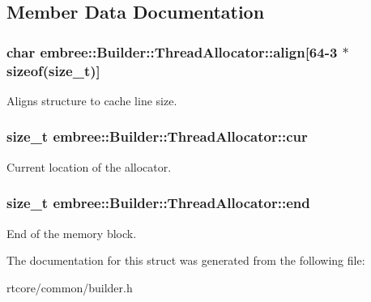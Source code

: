 \subsection{Member Data Documentation}
\hypertarget{structembree_1_1_builder_1_1_thread_allocator_aac64ccddbecccfb0a5d20421b9974179}{
\subsubsection[{align}]{\setlength{\rightskip}{0pt plus 5cm}char {\bf embree::Builder::ThreadAllocator::align}\mbox{[}64-\/3 $\ast$sizeof(size\_\-t)\mbox{]}}}
\label{structembree_1_1_builder_1_1_thread_allocator_aac64ccddbecccfb0a5d20421b9974179}


Aligns structure to cache line size. 

\hypertarget{structembree_1_1_builder_1_1_thread_allocator_abb22b1418877f34397ba8dedd4c3ce70}{
\subsubsection[{cur}]{\setlength{\rightskip}{0pt plus 5cm}size\_\-t {\bf embree::Builder::ThreadAllocator::cur}}}
\label{structembree_1_1_builder_1_1_thread_allocator_abb22b1418877f34397ba8dedd4c3ce70}


Current location of the allocator. 

\hypertarget{structembree_1_1_builder_1_1_thread_allocator_a88f9641d7ce77a79cacca61799318f6a}{
\subsubsection[{end}]{\setlength{\rightskip}{0pt plus 5cm}size\_\-t {\bf embree::Builder::ThreadAllocator::end}}}
\label{structembree_1_1_builder_1_1_thread_allocator_a88f9641d7ce77a79cacca61799318f6a}


End of the memory block. 



The documentation for this struct was generated from the following file:\begin{DoxyCompactItemize}
\item 
rtcore/common/builder.h\end{DoxyCompactItemize}
